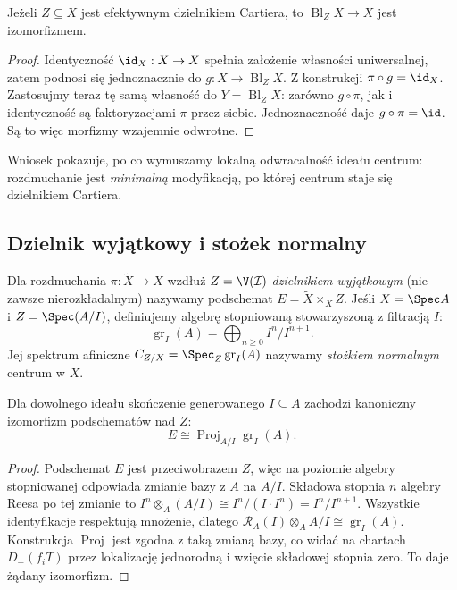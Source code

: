 \begin{wniosek}
\label{wn:ga5-cartier-trivial}
Jeżeli $Z\subseteq X$ jest efektywnym dzielnikiem
Cartiera, to $\operatorname{Bl}_Z X\to X$ jest izomorfizmem.
\end{wniosek}
\begin{proof}
Identyczność $\id_X:X\to X$ spełnia założenie własności
uniwersalnej, zatem podnosi się jednoznacznie do
$g:X\to\operatorname{Bl}_Z X$. Z konstrukcji
$\pi\circ g=\id_X$. Zastosujmy teraz tę samą własność
do $Y=\operatorname{Bl}_Z X$: zarówno $g\circ\pi$,
jak i identyczność są faktoryzacjami $\pi$ przez siebie.
Jednoznaczność daje $g\circ\pi=\id$. Są to więc
morfizmy wzajemnie odwrotne.
\end{proof}

Wniosek pokazuje, po co wymuszamy lokalną odwracalność
ideału centrum: rozdmuchanie jest \emph{minimalną}
modyfikacją, po której centrum staje się dzielnikiem Cartiera.

\subsection{Dzielnik wyjątkowy i stożek normalny}

\begin{definicja}
Dla rozdmuchania $\pi:\widetilde X\to X$ wzdłuż
$Z=\V(\mathcal I)$ \emph{dzielnikiem wyjątkowym}
(nie zawsze nierozkładalnym) nazywamy podschemat
$E=\widetilde X\times_X Z$.
Jeśli $X=\Spec A$ i $Z=\Spec(A/I)$, definiujemy
algebrę stopniowaną stowarzyszoną z filtracją $I$:
\[
 \operatorname{gr}_I(A)=\bigoplus_{n\ge0}I^n/I^{n+1}.
\]
Jej spektrum afiniczne
$C_{Z/X}=\Spec_Z\operatorname{gr}_I(A)$
nazywamy \emph{stożkiem normalnym} centrum w $X$.
\end{definicja}

\begin{twierdzenie}
\label{tw:ga5-normalcone}
Dla dowolnego ideału skończenie generowanego $I\subseteq A$
zachodzi kanoniczny izomorfizm podschematów nad $Z$:
\[
 E\cong\operatorname{Proj}_{A/I}\operatorname{gr}_I(A).
\]
\end{twierdzenie}
\begin{proof}
Podschemat $E$ jest przeciwobrazem $Z$, więc na poziomie
algebry stopniowanej odpowiada zmianie bazy z $A$ na
$A/I$. Składowa stopnia $n$ algebry Reesa po tej
zmianie to
$I^n\otimes_A(A/I)\cong I^n/(I\cdot I^n)=I^n/I^{n+1}$.
Wszystkie identyfikacje respektują mnożenie, dlatego
$\mathcal R_A(I)\otimes_A A/I\cong\operatorname{gr}_I(A)$.
Konstrukcja $\operatorname{Proj}$ jest zgodna z taką
zmianą bazy, co widać na chartach
$D_+(f_iT)$ przez lokalizację jednorodną i wzięcie
składowej stopnia zero. To daje żądany izomorfizm.
\end{proof}

